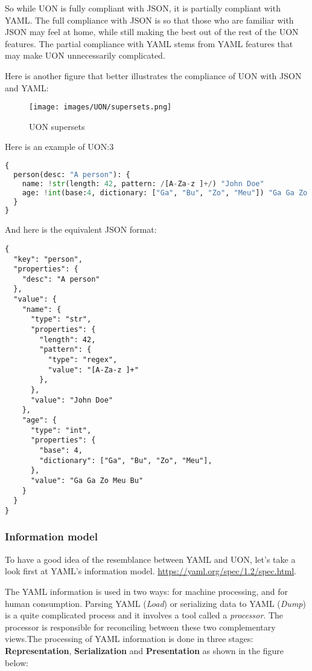 \documentclass[12pt]{article}
\begin{document}
So while UON is fully compliant with JSON, it is partially compliant with YAML. The full compliance with JSON is so that those who are familiar with JSON may feel at home, while still making the best out of the rest of the UON features. The partial compliance with YAML stems from YAML features that may make UON unnecessarily complicated.

Here is another figure that better illustrates the compliance of UON with JSON and YAML:

\begin{figure}[ht!]
 	\centering
 	\caption{UON supersets}
 	\texttt{[image: images/UON/supersets.png]}
 	\label{fig:UON supersets}
\end{figure}

Here is an example of UON:3
\begin{lstlisting}[language=python]
{
  person(desc: "A person"): {
    name: !str(length: 42, pattern: /[A-Za-z ]+/) "John Doe"
    age: !int(base:4, dictionary: ["Ga", "Bu", "Zo", "Meu"]) "Ga Ga Zo Meu Bu"
  }
}
\end{lstlisting}

And here is the equivalent JSON format:

\begin{verbatim}
{
  "key": "person",
  "properties": {
    "desc": "A person"
  },
  "value": {
    "name": {
      "type": "str",
      "properties": {
        "length": 42,
        "pattern": {
          "type": "regex",
          "value": "[A-Za-z ]+"
        },
      },
      "value": "John Doe"
    },
    "age": {
      "type": "int",
      "properties": {
        "base": 4,
        "dictionary": ["Ga", "Bu", "Zo", "Meu"],
      },
      "value": "Ga Ga Zo Meu Bu"
    }
  }
}
\end{verbatim}

\subsubsection{Information model}
To have a good idea of the resemblance between YAML and UON, let’s take a look first at YAML’s information model.
\url{https://yaml.org/spec/1.2/spec.html}. 

The YAML information is used in two ways: for machine processing, and for human consumption. Parsing YAML (\emph{Load}) or serializing data to YAML (\emph{Dump}) is a quite complicated process and it involves a tool called a \emph{processor}. The processor is responsible for reconciling between these two complementary views.The processing of YAML information is done in three stages: \textbf{Representation}, \textbf{Serialization} and \textbf{Presentation} as shown in the figure below:
\end{document}
